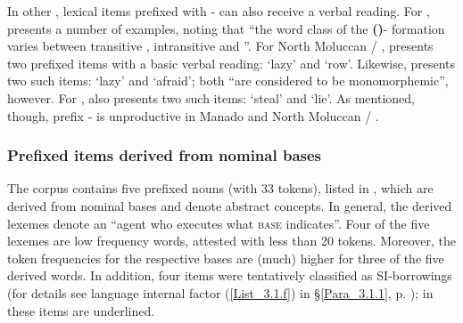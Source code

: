 In other , lexical items prefixed with - can also receive a verbal reading. For , \citet[109]{vanMinde.1997} presents a number of examples, noting that “the word class of the \textbf{(}\textbf{)}- formation varies between transitive , intransitive  and ”. For North Moluccan / , \citet[4]{Voorhoeve.1983} presents two prefixed items with a basic verbal reading:  ‘lazy’ and  ‘row’. Likewise, {\citet[40]{Litamahuputty.1994}} presents two such items:  ‘lazy’ and  ‘afraid’; both “are considered to be monomorphemic”, however. For , \citet[24]{Stoel.2005} also presents two such items:  ‘steal’ and  ‘lie’. As mentioned, though, prefix - is unproductive in Manado and North Moluccan / .


\subsubsection[Prefixed items derived from nominal bases]{Prefixed items derived from nominal bases}\label{Para_3.1.4.3}

The corpus contains five prefixed nouns (with 33 tokens), listed in , which are derived from nominal bases and denote abstract concepts. In general, the derived lexemes denote an ``agent who executes what \textsc{base} indicates''. Four of the five lexemes are low frequency words, attested with less than 20 tokens. Moreover, the token frequencies for the respective bases are (much) higher for three of the five derived words. In addition, four items were tentatively classified as SI-borrowings (for details see language internal factor (\ref{List_3.1.f}) in §\ref{Para_3.1.1}, p. \pageref{List_3.1.f}); in  these items are underlined.

